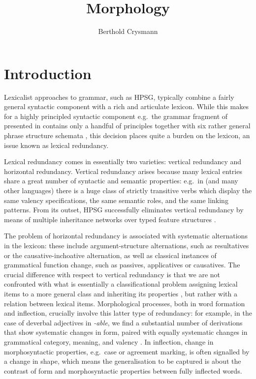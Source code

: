 \documentclass[output=paper,biblatex,babelshorthands,newtxmath,draftmode,colorlinks,citecolor=brown]{langscibook}
\title{Morphology}
\author{Berthold Crysmann\orcid{0000-0003-0230-502X}\affiliation{Centre national de la recherche scientifique (CNRS)}}
\begin{document}
\maketitle

\label{chap-morphology}




\section{Introduction}
\label{morphology-sec:Intro}

Lexicalist approaches to grammar, such as HPSG, typically combine a
fairly general syntactic component with a rich and articulate
lexicon. While this makes for a highly principled syntactic
component \emdash e.g.\ the grammar fragment of  presented in
\citet{Pollard94} contains only a handful of principles together with
six rather general phrase structure schemata \emdash, this decision places
quite a burden on the lexicon, an issue  known as lexical
redundancy.

Lexical redundancy comes in essentially two varieties: vertical redundancy
and horizontal redundancy. Vertical redundancy arises because many
lexical entries share a great number of syntactic and semantic
properties: e.g.\ in  (and many other languages) there is a huge
class of strictly transitive verbs which display the same valency
specifications, the same semantic roles, and the same linking
patterns. From its outset, HPSG successfully eliminates vertical
redundancy by means of multiple inheritance networks over typed
feature structures \citep{Flickinger:Pollard:ea:85a}.

The problem of horizontal redundancy is associated with systematic
alternations in the lexicon: these include argument-structure
alternations, such as resultatives or the causative-inchoative
alternation, as well as classical instances of grammatical function
change, such as passives, applicatives or causatives. The crucial
difference with respect to vertical redundancy is that we are not
confronted with what is essentially a classificational problem \emdash
assigning lexical items to a more general class and inheriting its
properties \emdash, but rather with a relation between lexical items.
Morphological processes, both in word formation and inflection,
crucially involve this latter type of redundancy: for example, in the
case of deverbal adjectives in \textit{-able}, we find a substantial
number of derivations that show systematic changes in form, paired
with equally systematic changes in grammatical category, meaning, and
valency \citep{Riehemann98}. In inflection, change in morphosyntactic
properties, e.g.\ case or agreement marking, is often signalled by a
change in shape, which means the generalisation to be captured is about the
contrast of form and morphosyntactic properties between fully
inflected words.
\end{document}
